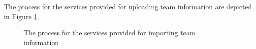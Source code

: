 The process for the services provided for uploading team information are depicted in Figure \ref{fig:teamInfo_process}.
\begin{figure}[htb]
\begin{center}
\end{center}
\caption{ The process for the services provided for importing team information \label{fig:teamInfo_process}}
\end{figure}
